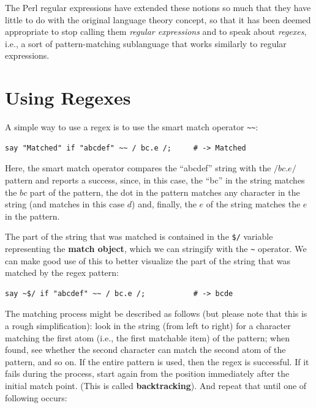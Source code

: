 The Perl regular expressions have extended these notions 
so much that they have little to do with the original 
language theory concept, so that 
it has been deemed appropriate to stop calling them 
\emph{regular expressions} and to speak about \emph{regexes}, 
i.e., a sort of pattern-matching sublanguage that works 
similarly to regular expressions.

\section{Using Regexes}
\label{using_regexes}

A simple way to use a regex is to use the smart match operator 
\verb'~~':

\begin{verbatim}
say "Matched" if "abcdef" ~~ / bc.e /;     # -> Matched
\end{verbatim}
%

Here, the smart match operator compares the ``abcdef'' string 
with the $/bc.e/$ pattern and reports a success, since, in 
this case, the ``bc'' in the string matches the $bc$ part of 
the pattern, the dot in the pattern matches any character in the string (and matches in this case $d$) and, finally, the $e$ of 
the string matches the $e$ in the pattern.

The part of the string that was matched is contained in the 
\verb'$/' variable representing the {\bf match object}, which we 
can stringify with the \verb'~' operator. We can make good 
use of this to better visualize the part of the string 
that was matched by the regex pattern:

\begin{verbatim}
say ~$/ if "abcdef" ~~ / bc.e /;           # -> bcde
\end{verbatim}
%



The matching process might be described as follows (but please 
note that this is a rough simplification): look 
in the string (from left to right) for a character matching 
the first atom (i.e., the first matchable item) of the 
pattern; when found, see whether the second 
character can match the second atom of the pattern, and so on. 
If the entire pattern is used, then the regex is successful.
If it fails during the process, start again from the position 
immediately after the initial match point. (This is called 
{\bf backtracking}). And repeat that until one of following 
occurs:

